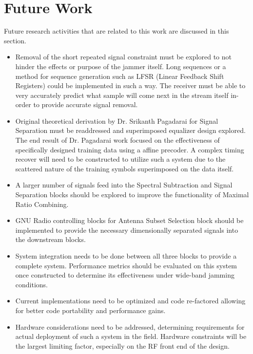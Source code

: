 \section{Future Work}

Future research activities that are related to this work are discussed in this section.

\begin{itemize}

\item Removal of the short repeated signal constraint must be explored to not hinder the effects or purpose of the jammer itself.  Long sequences or a method for sequence generation such as LFSR (Linear Feedback Shift Registers) could be implemented in such a way.  The receiver must be able to very accurately predict what sample will come next in the stream itself in-order to provide accurate signal removal.

\item Original theoretical derivation by Dr. Srikanth Pagadarai for Signal Separation must be readdressed and superimposed equalizer design explored.  The end result of Dr. Pagadarai work focused on the effectiveness of specifically designed training data using a affine precoder.  A complex timing recover will need to be constructed to utilize such a system due to the scattered nature of the training symbols superimposed on the data itself.

\item A larger number of signals feed into the Spectral Subtraction and Signal Separation blocks should be explored to improve the functionality of Maximal Ratio Combining.

\item GNU Radio controlling blocks for Antenna Subset Selection block should be implemented to provide the necessary dimensionally separated signals into the downstream blocks.

\item System integration needs to be done between all three blocks to provide a complete system.  Performance metrics should be evaluated on this system once constructed to determine its effectiveness under wide-band jamming conditions.

\item Current implementations need to be optimized and code re-factored allowing for better code portability and performance gains.

\item Hardware considerations need to be addressed, determining requirements for actual deployment of such a system in the field.  Hardware constraints will be the largest limiting factor, especially on the RF front end of the design.



\end{itemize}
